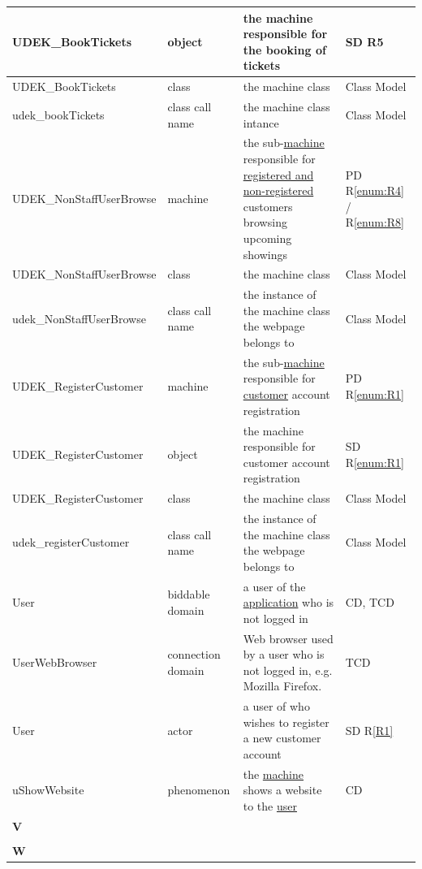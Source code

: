 \documentclass[a4paper,10pt,titlepage,bibtotoc,bibtotocnumbered]{scrreprt}
\begin{document}
\begin{longtable}{|p{4cm}|p{3cm}|p{5cm}|l|}
\hline
UDEK\_BookTickets & object & the machine responsible for the booking of tickets & SD R5\\
\hline
UDEK\_BookTickets & class & the machine class & Class Model\\
\hline
udek\_bookTickets & class call name & the machine class intance & Class Model\\
\hline
\hypertarget{glossary:UDEK-NonStaffUserBrowse}{UDEK\_NonStaffUserBrowse} & machine & the sub-\hyperlink{glossary:UDEKino}{machine} responsible for \hyperlink{glossary:NonStaffUser}{registered and non-registered} customers browsing upcoming showings & PD R\ref{enum:R4} / R\ref{enum:R8}\\
\hline
UDEK\_NonStaffUserBrowse & class & the machine class & Class Model\\
\hline
udek\_NonStaffUserBrowse & class call name & the instance of the machine class the webpage belongs to & Class Model\\
\hline
\hypertarget{glossary:UDEK-RegisterCustomer}{UDEK\_RegisterCustomer} & machine & the sub-\hyperlink{glossary:UDEKino}{machine} responsible for \hyperlink{glossary:Customer}{customer} account registration & PD R\ref{enum:R1}\\
\hline
UDEK\_RegisterCustomer & object & the machine responsible for customer account registration & SD R\ref{enum:R1}\\
\hline
UDEK\_RegisterCustomer & class & the machine class & Class Model\\
\hline
udek\_registerCustomer & class call name & the instance of the machine class the webpage belongs to & Class Model\\
\hline
\hypertarget{glossary:User}{User} & biddable domain & a user of the \hyperlink{glossary:UDEKino}{application} who is not logged in & CD, TCD\\
\hline
UserWebBrowser & connection domain & Web browser used by a user who is not logged in, e.g. Mozilla Firefox. & TCD\\
\hline
User & actor & a user of who wishes to register a new customer account & SD R\ref{R1}\\
\hline
\hypertarget{glossary:uShowWebsite}{uShowWebsite} & phenomenon & the \hyperlink{glossary:UDEKino}{machine} shows a website to the \hyperlink{glossary:User}{user} & CD\\
\hline
\multicolumn{4}{|l|}{\textbf{V}}\\
\hline
&  &  & \\
\hline
\multicolumn{4}{|l|}{\textbf{W}}\\

\end{longtable}
\end{document}
